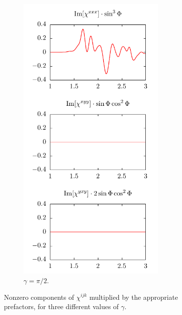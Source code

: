 \documentclass[aps,prb,10pt,letterpaper,notitlepage]{revtex4-1}
\begin{document}
\begin{figure}[b]
\begin{subfigure}[b]{0.25\textwidth}
        \includegraphics[width=0.8\textwidth]{rot/comps90.pdf}
        \caption{$\gamma = \pi/2$.}
    \end{subfigure}
    \caption{Nonzero components of $\chi^{ijk}$ multiplied by the appropriate
    prefactors, for three different values of $\gamma$.}
    \label{fig:comps}
\end{figure}
\end{document}
